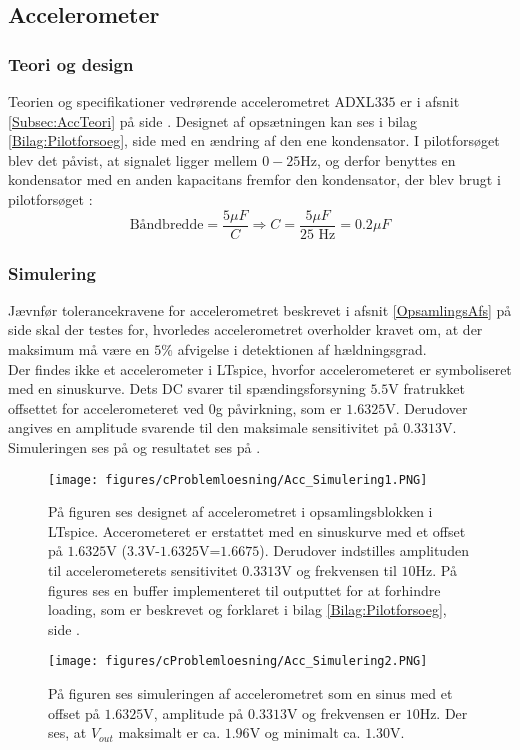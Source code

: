 \subsection{Accelerometer}\label{Acc_afsnit}
\subsubsection{Teori og design}
Teorien og specifikationer vedrørende accelerometret ADXL$335$ er i afsnit \ref{Subsec:AccTeori} på side \pageref{Subsec:AccTeori}. Designet af opsætningen kan ses i bilag \ref{Bilag:Pilotforsoeg}, side \pageref{Bilag:Pilotforsoeg} med en ændring af den ene kondensator. I pilotforsøget blev det påvist, at signalet ligger mellem $0-25$Hz, og derfor benyttes en kondensator med en anden kapacitans fremfor den kondensator, der blev brugt i pilotforsøget \cite{Devices2009}:
\begin{equation}
\text{Båndbredde} = \dfrac{5\mu F}{C} \Rightarrow  C = \dfrac{5\mu F}{\text{25 Hz}} = 0.2\mu F
\end{equation}

\subsubsection{Simulering}
Jævnfør tolerancekravene for accelerometret beskrevet i afsnit \ref{OpsamlingsAfs} på side \pageref{OpsamlingsAfs} skal der testes for, hvorledes accelerometret overholder kravet om, at der maksimum må være en $5\%$ afvigelse i detektionen af hældningsgrad. \\
Der findes ikke et accelerometer i LTspice, hvorfor accelerometeret er symboliseret med en sinuskurve. Dets DC svarer til spændingsforsyning $5.5$V fratrukket offsettet for accelerometeret ved $0$g påvirkning, som er $1.6325$V. Derudover angives en amplitude svarende til den maksimale sensitivitet på $0.3313$V. Simuleringen ses på  og resultatet ses på .
\begin{figure}[H]
	\centering
	\texttt{[image: figures/cProblemloesning/Acc\_Simulering1.PNG]}
	\caption{På figuren ses designet af accelerometret i opsamlingsblokken i LTspice. Accerometeret er erstattet med en sinuskurve med et offset på $1.6325$V ($3.3$V-$1.6325$V=$1.6675$). Derudover indstilles amplituden til accelerometerets sensitivitet $0.3313$V og frekvensen til $10$Hz. På figures ses en buffer implementeret til outputtet for at forhindre loading, som er beskrevet og forklaret i bilag \ref{Bilag:Pilotforsoeg}, side \pageref{Bilag:Pilotforsoeg}.}
	\label{fig:acc_simulering}
\end{figure}
\begin{figure}[H]
	\centering
	\texttt{[image: figures/cProblemloesning/Acc\_Simulering2.PNG]}
	\caption{På figuren ses simuleringen af accelerometret som en sinus med et offset på $1.6325$V, amplitude på $0.3313$V og frekvensen er $10$Hz. Der ses, at $V_{out}$ maksimalt er ca. $1.96$V og minimalt ca. $1.30$V.}
	\label{fig:acc_simulering_resultat}
\end{figure}

